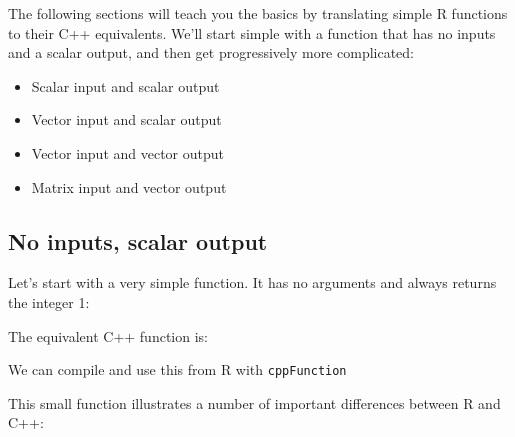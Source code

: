 The following sections will teach you the basics by translating simple R
functions to their C++ equivalents. We'll start simple with a function
that has no inputs and a scalar output, and then get progressively more
complicated:

\begin{itemize}
\tightlist
\item
  Scalar input and scalar output
\item
  Vector input and scalar output
\item
  Vector input and vector output
\item
  Matrix input and vector output
\end{itemize}

\hypertarget{no-inputs-scalar-output}{%
\subsection{No inputs, scalar output}\label{no-inputs-scalar-output}}

Let's start with a very simple function. It has no arguments and always
returns the integer 1:

\begin{Shaded}
\begin{Highlighting}[]
\StringTok{ }
\end{Highlighting}
\end{Shaded}

The equivalent C++ function is:

\begin{Shaded}
\begin{Highlighting}[]
   \NormalTok{;}
\NormalTok{\}}
\end{Highlighting}
\end{Shaded}

We can compile and use this from R with \texttt{cppFunction}

\begin{Shaded}
\begin{Highlighting}[]
\NormalTok{(}
\NormalTok{)}
\end{Highlighting}
\end{Shaded}

This small function illustrates a number of important differences
between R and C++:

